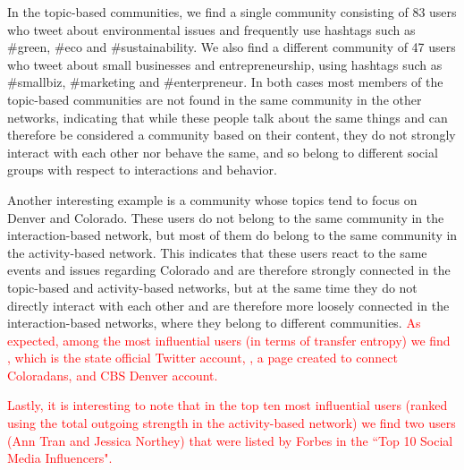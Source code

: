 In the topic-based communities, we find a single community consisting of 83 users who tweet about environmental issues and frequently use hashtags such as \#green, \#eco and \#sustainability. We also find a different community of 47 users who tweet about small businesses and entrepreneurship, using hashtags such as \#smallbiz, \#marketing and \#enterpreneur. In both cases most members of the topic-based communities are not found in the same community in the other networks, indicating that while these people talk about the same things and can therefore be considered a community based on their content, they do not strongly interact with each other nor behave the same, and so belong to different social groups with respect to interactions and behavior.

Another interesting example is a community whose topics tend to focus on Denver and Colorado. These users do not belong to the same community in the interaction-based network, but most of them do belong to the same community in the activity-based network. This indicates that these users react to the same events and issues regarding Colorado and are therefore strongly connected in the topic-based and activity-based networks, but at the same time they do not directly interact with each other and are therefore more loosely connected in the interaction-based networks, where they belong to different communities. \textcolor{red}{As expected, among the most influential users (in terms of transfer entropy) we find \@Colorado, which is the state official Twitter account, \@ConnectColorado, a page created to connect Coloradans, and CBS Denver account.}

\textcolor{red}{Lastly, it is interesting to note that in the top ten most influential users (ranked using the total outgoing strength in the activity-based network) we find two users (Ann Tran and Jessica Northey) that were listed by Forbes in the ``Top 10 Social Media Influencers".}